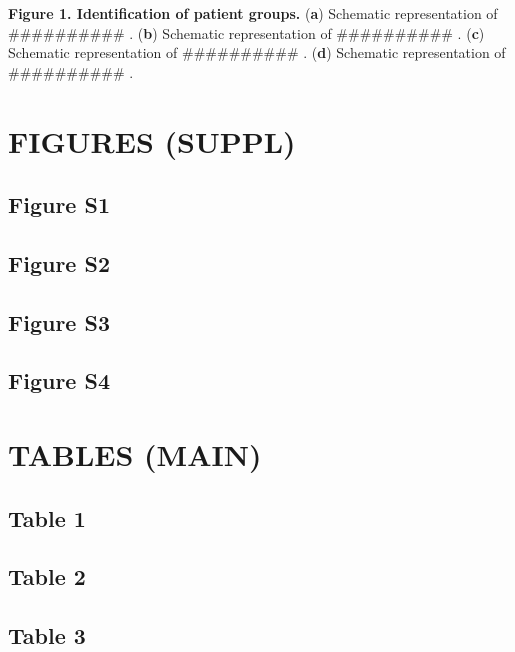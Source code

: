 \documentclass[
]{article}
\begin{document}
\textbf{Figure 1. Identification of patient groups.}
(\textbf{a}) Schematic representation of \#\#\#\#\#\#\#\#\#\# .
(\textbf{b}) Schematic representation of \#\#\#\#\#\#\#\#\#\# .
(\textbf{c}) Schematic representation of \#\#\#\#\#\#\#\#\#\# .
(\textbf{d}) Schematic representation of \#\#\#\#\#\#\#\#\#\# .

\clearpage

\hypertarget{figures-suppl}{%
\section{FIGURES (SUPPL)}\label{figures-suppl}}

\hypertarget{figure-s1}{%
\subsection{Figure S1}\label{figure-s1}}

\hypertarget{figure-s2}{%
\subsection{Figure S2}\label{figure-s2}}

\hypertarget{figure-s3}{%
\subsection{Figure S3}\label{figure-s3}}

\hypertarget{figure-s4}{%
\subsection{Figure S4}\label{figure-s4}}

\hypertarget{tables-main}{%
\section{TABLES (MAIN)}\label{tables-main}}

\hypertarget{table-1}{%
\subsection{Table 1}\label{table-1}}

\hypertarget{table-2}{%
\subsection{Table 2}\label{table-2}}

\hypertarget{table-3}{%
\subsection{Table 3}\label{table-3}}
\end{document}
